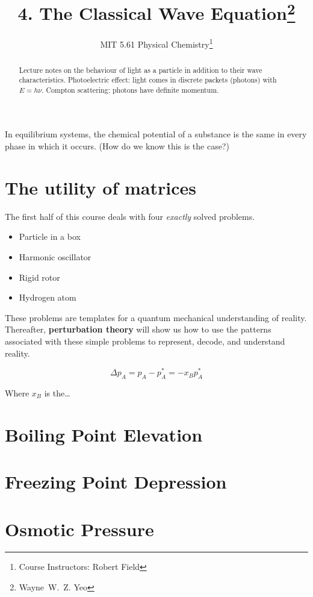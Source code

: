 \documentclass[a4paper]{tufte-handout}
\title{4. The Classical Wave Equation\thanks{Wayne~W.~Z. Yeo}}
\author[MIT 5.61]{\textnormal{MIT 5.61} Physical Chemistry\thanks{Course Instructors: Robert Field}}
\begin{document}
\maketitle %

\begin{abstract}
\noindent
Lecture notes on the behaviour of light as a particle in addition to their wave characteristics. Photoelectric effect: light
comes in discrete packets (photons) with $E = h \nu$. Compton scattering: photons have definite momentum.
\end{abstract}


In equilibrium systems, the chemical potential of a substance is the same in every phase in which it occurs.
(How do we know this is the case?)

\section*{The utility of matrices}

The first half of this course deals with four \textit{exactly} solved problems.

\begin{itemize}
  \item Particle in a box
  \item Harmonic oscillator
  \item Rigid rotor
  \item Hydrogen atom
\end{itemize}

These problems are templates for a quantum mechanical understanding of reality. Thereafter, \textbf{perturbation theory} will 
show us how to use the patterns associated with these simple
problems to represent, decode, and understand reality.

$$\Delta p_A = p_A - p^{*}_{A} = -x_B p^*_A$$

Where $x_B$ is the\dots

\section*{Boiling Point Elevation}

\section*{Freezing Point Depression}

\section*{Osmotic Pressure}
\end{document}
